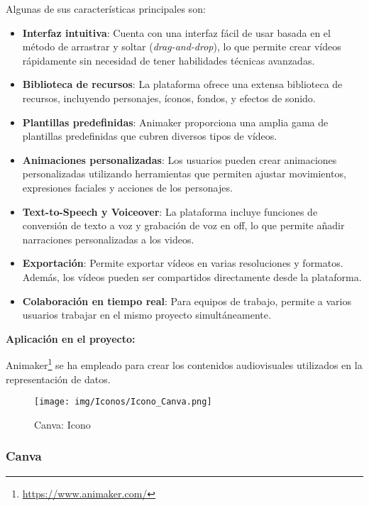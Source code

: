 \documentclass[a4paper, 12pt]{book}
\begin{document}
    Algunas de sus características principales son:
    
    \begin{itemize}
        \item \textbf{Interfaz intuitiva}: Cuenta con una interfaz fácil de usar basada en el método de arrastrar y soltar (\textit{drag-and-drop}), lo que permite crear vídeos rápidamente sin necesidad de tener habilidades técnicas avanzadas.
        \item \textbf{Biblioteca de recursos}: La plataforma ofrece una extensa biblioteca de recursos, incluyendo personajes, íconos, fondos, y efectos de sonido.
        \item \textbf{Plantillas predefinidas}: Animaker proporciona una amplia gama de plantillas predefinidas que cubren diversos tipos de vídeos.
        \item \textbf{Animaciones personalizadas}: Los usuarios pueden crear animaciones personalizadas utilizando herramientas que permiten ajustar movimientos, expresiones faciales y acciones de los personajes.
        \item \textbf{Text-to-Speech y Voiceover}: La plataforma incluye funciones de conversión de texto a voz y grabación de voz en off, lo que permite añadir narraciones personalizadas a los videos.
        \item \textbf{Exportación}: Permite exportar vídeos en varias resoluciones y formatos. Además, los vídeos pueden ser compartidos directamente desde la plataforma.
        \item \textbf{Colaboración en tiempo real}: Para equipos de trabajo, permite a varios usuarios trabajar en el mismo proyecto simultáneamente.
    \end{itemize}
    
        \vspace{0.5cm} %
        \textbf{Aplicación en el proyecto:} 
        
       Animaker\footnote{\url{https://www.animaker.com/}} se ha empleado para crear los contenidos audiovisuales utilizados en la representación de datos.
    
    
        \begin{figure}[H]
            \centering
            \texttt{[image: img/Iconos/Icono\_Canva.png]}
            \caption{Canva: Icono}
            \label{fig:enter-label}
         \end{figure}
        \subsubsection{Canva}
    
\end{document}
